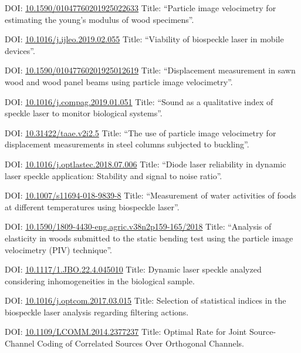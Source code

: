 \documentclass[11pt,a4paper,sans]{moderncv} %
\newcommand{\doiurl}[1]{\href{https://doi.org/#1}{#1}}
\begin{document}
	      {DOI: \doiurl{10.1590/01047760201925022633}}{}{}
	      {Title: ``Particle image velocimetry for estimating the young’s modulus of wood specimens''.}

	      {DOI: \doiurl{10.1016/j.ijleo.2019.02.055}}{}{}
	      {Title: ``Viability of biospeckle laser in mobile devices''.}

	      {DOI: \doiurl{10.1590/01047760201925012619}}{}{}
	      {Title: ``Displacement measurement in sawn wood and wood panel beams using particle image velocimetry''.}

	      {DOI: \doiurl{10.1016/j.compag.2019.01.051}}{}{}
	      {Title: ``Sound as a qualitative index of speckle laser to monitor biological systems''.}

	      {DOI: \doiurl{10.31422/taae.v2i2.5}}{}{}
	      {Title: ``The use of particle image velocimetry for displacement measurements in steel columns subjected to buckling''.}
	      
	      {DOI: \doiurl{10.1016/j.optlastec.2018.07.006}}{}{}
	      {Title: ``Diode laser reliability in dynamic laser speckle application: Stability and signal to noise ratio''.}
	      
	      {DOI: \doiurl{10.1007/s11694-018-9839-8}}{}{}
	      {Title: ``Measurement of water activities of foods at different temperatures using biospeckle laser''.}

	      {DOI: \doiurl{10.1590/1809-4430-eng.agric.v38n2p159-165/2018}}{}{}
	      {Title: ``Analysis of elasticity in woods submitted to the static bending test using the particle image velocimetry (PIV) technique''.}

	      {DOI: \doiurl{10.1117/1.JBO.22.4.045010}}{}{}
	      {Title: Dynamic laser speckle analyzed considering inhomogeneities in the biological sample.}
	      
	      {DOI: \doiurl{10.1016/j.optcom.2017.03.015}}{}{}
	      {Title: Selection of statistical indices in the biospeckle laser analysis regarding filtering actions.}
	      
	      {DOI: \doiurl{10.1109/LCOMM.2014.2377237}}{}{}
	      {Title: Optimal  Rate for Joint Source-Channel Coding of Correlated Sources Over Orthogonal Channels.}
\end{document}
